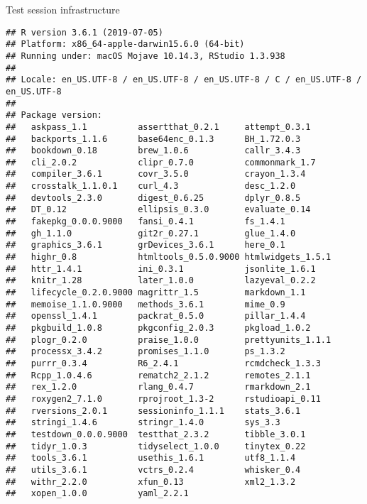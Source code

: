 \documentclass[
]{book}
\begin{document}
Test session infrastructure

\begin{verbatim}
## R version 3.6.1 (2019-07-05)
## Platform: x86_64-apple-darwin15.6.0 (64-bit)
## Running under: macOS Mojave 10.14.3, RStudio 1.3.938
## 
## Locale: en_US.UTF-8 / en_US.UTF-8 / en_US.UTF-8 / C / en_US.UTF-8 / en_US.UTF-8
## 
## Package version:
##   askpass_1.1          assertthat_0.2.1     attempt_0.3.1       
##   backports_1.1.6      base64enc_0.1.3      BH_1.72.0.3         
##   bookdown_0.18        brew_1.0.6           callr_3.4.3         
##   cli_2.0.2            clipr_0.7.0          commonmark_1.7      
##   compiler_3.6.1       covr_3.5.0           crayon_1.3.4        
##   crosstalk_1.1.0.1    curl_4.3             desc_1.2.0          
##   devtools_2.3.0       digest_0.6.25        dplyr_0.8.5         
##   DT_0.12              ellipsis_0.3.0       evaluate_0.14       
##   fakepkg_0.0.0.9000   fansi_0.4.1          fs_1.4.1            
##   gh_1.1.0             git2r_0.27.1         glue_1.4.0          
##   graphics_3.6.1       grDevices_3.6.1      here_0.1            
##   highr_0.8            htmltools_0.5.0.9000 htmlwidgets_1.5.1   
##   httr_1.4.1           ini_0.3.1            jsonlite_1.6.1      
##   knitr_1.28           later_1.0.0          lazyeval_0.2.2      
##   lifecycle_0.2.0.9000 magrittr_1.5         markdown_1.1        
##   memoise_1.1.0.9000   methods_3.6.1        mime_0.9            
##   openssl_1.4.1        packrat_0.5.0        pillar_1.4.4        
##   pkgbuild_1.0.8       pkgconfig_2.0.3      pkgload_1.0.2       
##   plogr_0.2.0          praise_1.0.0         prettyunits_1.1.1   
##   processx_3.4.2       promises_1.1.0       ps_1.3.2            
##   purrr_0.3.4          R6_2.4.1             rcmdcheck_1.3.3     
##   Rcpp_1.0.4.6         rematch2_2.1.2       remotes_2.1.1       
##   rex_1.2.0            rlang_0.4.7          rmarkdown_2.1       
##   roxygen2_7.1.0       rprojroot_1.3-2      rstudioapi_0.11     
##   rversions_2.0.1      sessioninfo_1.1.1    stats_3.6.1         
##   stringi_1.4.6        stringr_1.4.0        sys_3.3             
##   testdown_0.0.0.9000  testthat_2.3.2       tibble_3.0.1        
##   tidyr_1.0.3          tidyselect_1.0.0     tinytex_0.22        
##   tools_3.6.1          usethis_1.6.1        utf8_1.1.4          
##   utils_3.6.1          vctrs_0.2.4          whisker_0.4         
##   withr_2.2.0          xfun_0.13            xml2_1.3.2          
##   xopen_1.0.0          yaml_2.2.1
\end{verbatim}
\end{document}

